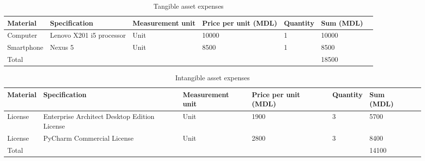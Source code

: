 \begin{table}[!ht]
\begin{center}
\caption{Tangible asset expenses}
\begin{tabularx}{\textwidth}{| M{5em} | Y | M{7em} | M{5em} | M{5em} | M{5em} |N}
\hline
\textbf{Material} & \textbf{Specification} & \textbf{Measurement unit} & \textbf{Price per unit (MDL)} & \textbf{Quantity} & \textbf{Sum (MDL)} &\\[18pt]
\hline
Computer & Lenovo X201 i5 processor & Unit & 10000 & 1 & 10000 &\\[14pt]
\hline
Smartphone & Nexus 5 & Unit & 8500 & 1 & 8500 &\\[14pt]
\hline
Total & & & & & 18500 &\\[14pt]
\hline
\end{tabularx}
\label{table:tangible_assets}
\end{center}
\end{table}

\begin{table}[!ht]
\begin{center}
\caption{Intangible asset expenses}
\begin{tabularx}{\textwidth}{| M{5em} | Y | M{7em} | M{5em} | M{5em} | M{5em} |N}
\hline
\textbf{Material} & \textbf{Specification} & \textbf{Measurement unit} & \textbf{Price per unit (MDL)} & \textbf{Quantity} & \textbf{Sum (MDL)} &\\[18pt]
\hline
License & Enterprise Architect Desktop Edition License & Unit & 1900 & 3 & 5700 &\\[14pt]
\hline
License & PyCharm Commercial License & Unit & 2800 & 3 & 8400 &\\[14pt]
\hline
Total & & & & & 14100 &\\[14pt]
\hline
\end{tabularx}
\label{table:intangible_assets}
\end{center}
\end{table}

